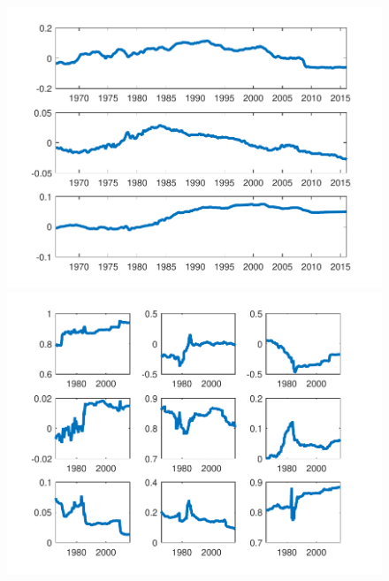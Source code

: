 \documentclass[12pt,reqno]{article}
\numberwithin{equation}{section}
\begin{document}
\begin{figure}[H]
\includegraphics[scale=0.6]{NKPC_ree_init_VAR1_alphas.pdf}
\includegraphics[scale=0.6]{NKPC_ree_init_VAR1_betas.pdf}


\end{figure}

\newpage
\end{document}

